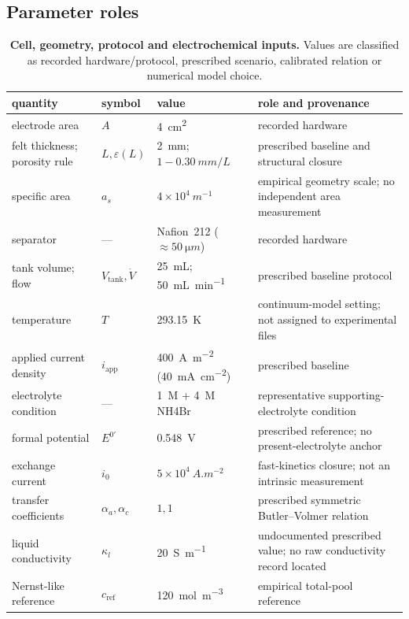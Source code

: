 \documentclass[11pt]{article}
\let\SIorigsubsection\subsection
\renewcommand{\subsection}{\FloatBarrier\SIorigsubsection}
\newcommand{\iapp}{i_{\mathrm{app}}}
\begin{document}
\subsection{Parameter roles}

\begin{table}[!htbp]
\centering\footnotesize
\caption{\textbf{Cell, geometry, protocol and electrochemical inputs.} Values are classified as recorded
hardware/protocol, prescribed scenario, calibrated relation or numerical model choice.}
\label{tab:cell-inputs}
\begin{tabularx}{\textwidth}{@{}P{3.25cm}P{2.0cm}P{3.35cm}Y@{}}
\toprule
quantity & symbol & value & role and provenance\\
\midrule
electrode area & $A$ & \SI{4}{cm^2} & recorded hardware\\
felt thickness; porosity rule & $L,\varepsilon(L)$ & \SI{2}{mm}; $1-\SI{0.30}{mm}/L$ & prescribed baseline and structural closure\\
specific area & $a_s$ & $4\times10^4~\si{m^{-1}}$ & empirical geometry scale; no independent area measurement\\
separator & --- & Nafion~212 ($\approx\SI{50}{\micro m}$) & recorded hardware\\
tank volume; flow & $V_{\mathrm{tank}},\dot V$ & \SI{25}{mL}; \SI{50}{mL.min^{-1}} & prescribed baseline protocol\\
temperature & $T$ & \SI{293.15}{K} & continuum-model setting; not assigned to experimental files\\
applied current density & $\iapp$ & \SI{400}{A.m^{-2}} (\SI{40}{mA.cm^{-2}}) & prescribed baseline\\
electrolyte condition & --- & \SI{1}{M}  + \SI{4}{M} NH4Br & representative supporting-electrolyte condition\\
formal potential & $E^{0\prime}$ & \SI{0.548}{V} & prescribed reference; no present-electrolyte anchor\\
exchange current & $i_0$ & $5\times10^4~\si{A.m^{-2}}$ & fast-kinetics closure; not an intrinsic measurement\\
transfer coefficients & $\alpha_a,\alpha_c$ & $1,1$ & prescribed symmetric Butler--Volmer relation\\
liquid conductivity & $\kappa_l$ & \SI{20}{S.m^{-1}} & undocumented prescribed value; no raw conductivity record located\\
Nernst-like reference & $c_{\mathrm{ref}}$ & \SI{120}{mol.m^{-3}} & empirical total-pool reference\\
\bottomrule
\end{tabularx}
\end{table}
\end{document}
